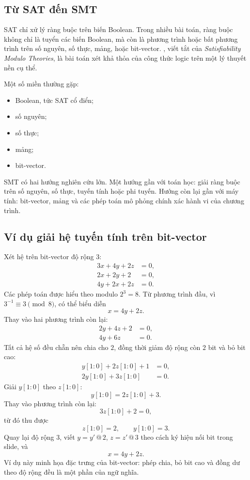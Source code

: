 \documentclass[11pt]{article}
\begin{document}
\subsection{Từ SAT đến SMT}

SAT chỉ xử lý ràng buộc trên biến Boolean. Trong nhiều bài toán, ràng buộc
không chỉ là tuyển các biến Boolean, mà còn là phương trình hoặc bất phương
trình trên số nguyên, số thực, mảng, hoặc bit-vector. , viết tắt
của \textit{Satisfiability Modulo Theories}, là bài toán xét khả thỏa của
công thức logic trên một lý thuyết nền cụ thể.

Một số miền thường gặp:
\begin{itemize}
  \item Boolean, tức SAT cổ điển;
  \item số nguyên;
  \item số thực;
  \item mảng;
  \item bit-vector.
\end{itemize}

SMT có hai hướng nghiên cứu lớn. Một hướng gần với toán học: giải ràng buộc
trên số nguyên, số thực, tuyến tính hoặc phi tuyến. Hướng còn lại gần với
máy tính: bit-vector, mảng và các phép toán mô phỏng chính xác hành vi của
chương trình.

\subsection{Ví dụ giải hệ tuyến tính trên bit-vector}

Xét hệ trên bit-vector độ rộng \(3\):
\[
\begin{aligned}
3x+4y+2z&=0,\\
2x+2y+2&=0,\\
4y+2x+2z&=0.
\end{aligned}
\]
Các phép toán được hiểu theo modulo \(2^3=8\). Từ phương trình đầu, vì
\(3^{-1}\equiv3\pmod 8\), có thể biểu diễn
\[
  x=4y+2z.
\]
Thay vào hai phương trình còn lại:
\[
\begin{aligned}
2y+4z+2&=0,\\
4y+6z&=0.
\end{aligned}
\]
Tất cả hệ số đều chẵn nên chia cho \(2\), đồng thời giảm độ rộng còn \(2\)
bit và bỏ bit cao:
\[
\begin{aligned}
y[1:0]+2z[1:0]+1&=0,\\
2y[1:0]+3z[1:0]&=0.
\end{aligned}
\]
Giải \(y[1:0]\) theo \(z[1:0]\):
\[
  y[1:0]=2z[1:0]+3.
\]
Thay vào phương trình còn lại:
\[
  3z[1:0]+2=0,
\]
từ đó thu được
\[
  z[1:0]=2,\qquad y[1:0]=3.
\]
Quay lại độ rộng \(3\), viết \(y=y'\mathbin{@}2\), \(z=z'\mathbin{@}3\) theo
cách ký hiệu nối bit trong slide, và
\[
  x=4y+2z.
\]
Ví dụ này minh họa đặc trưng của bit-vector: phép chia, bỏ bit cao và đồng dư
theo độ rộng đều là một phần của ngữ nghĩa.
\end{document}
